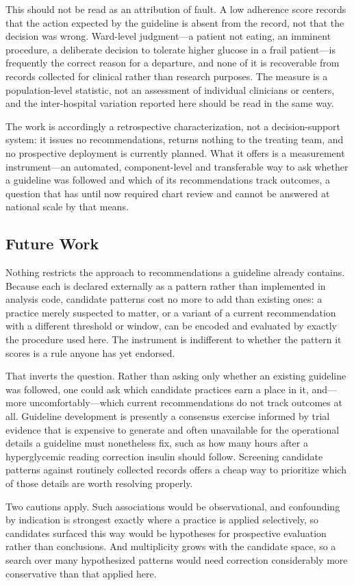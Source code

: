 This should not be read as an attribution of fault. A low adherence score
records that the action expected by the guideline is absent from the record,
not that the decision was wrong. Ward-level judgment---a patient not eating,
an imminent procedure, a deliberate decision to tolerate higher glucose in a
frail patient---is frequently the correct reason for a departure, and none
of it is recoverable from records collected for clinical rather than
research purposes. The measure is a population-level statistic, not an
assessment of individual clinicians or centers, and the inter-hospital
variation reported here should be read in the same way.

The work is accordingly a retrospective characterization, not a
decision-support system: it issues no recommendations, returns nothing to
the treating team, and no prospective deployment is currently planned. What
it offers is a measurement instrument---an automated, component-level and
transferable way to ask whether a guideline was followed and which of its
recommendations track outcomes, a question that has until now required chart
review and cannot be answered at national scale by that means.

\subsection{Future Work}

Nothing restricts the approach to recommendations a guideline already
contains. Because each is declared externally as a pattern rather than
implemented in analysis code, candidate patterns cost no more to add than
existing ones: a practice merely suspected to matter, or a variant of a
current recommendation with a different threshold or window, can be encoded
and evaluated by exactly the procedure used here. The instrument is
indifferent to whether the pattern it scores is a rule anyone has yet
endorsed.

That inverts the question. Rather than asking only whether an existing
guideline was followed, one could ask which candidate practices earn a place
in it, and---more uncomfortably---which current recommendations do not track
outcomes at all. Guideline development is presently a consensus exercise
informed by trial evidence that is expensive to generate and often
unavailable for the operational details a guideline must nonetheless fix,
such as how many hours after a hyperglycemic reading correction insulin
should follow. Screening candidate patterns against routinely collected
records offers a cheap way to prioritize which of those details are worth
resolving properly.

Two cautions apply. Such associations would be observational, and
confounding by indication is strongest exactly where a practice is applied
selectively, so candidates surfaced this way would be hypotheses for
prospective evaluation rather than conclusions. And multiplicity grows with
the candidate space, so a search over many hypothesized patterns would need
correction considerably more conservative than that applied here.
